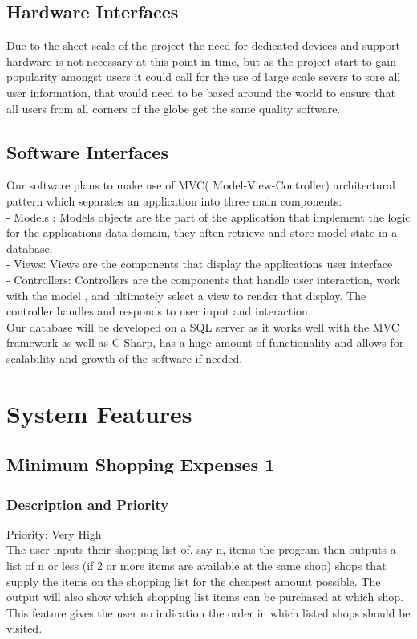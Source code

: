 \documentclass[12pt]{article}
\begin{document}
\subsection{Hardware Interfaces}
Due to the sheet scale of the project the need for dedicated devices and support hardware is not necessary at this point in time, but as the project start to gain popularity amongst users it could call for the use of large scale severs to sore all user information, that would need to be based around the world to ensure that all users from all corners of the globe get the same quality software.
\subsection{Software Interfaces}
Our software plans to make use of MVC( Model-View-Controller) architectural pattern which separates an application into three main components:\\
-	Models : Models objects are the part of the application that implement the logic for the applications data domain, they often retrieve and store model state in a database.\\
-	Views: Views are the components that display the applications user interface \\
-	Controllers: Controllers are the components that handle user interaction, work with the model , and ultimately select a view to render that display. The controller handles and responds to user input and interaction.\\
   

Our database will be developed on a SQL server as it works well with the MVC framework as well as C-Sharp, has a huge amount of functionality and allows for scalability and growth of the software if needed. 

\section{System Features}
\subsection{Minimum Shopping Expenses 1}
\subsubsection{Description and Priority}
Priority: Very High\\
 The user inputs their shopping list of, say n, items the program then outputs a list of n or less (if 2 or more items are available at the same shop) shops that supply the items on the shopping list for the cheapest amount possible. The output will also show which shopping list items can be purchased at which shop. This feature gives the user no indication the order in which listed shops should be visited.  
\end{document}
